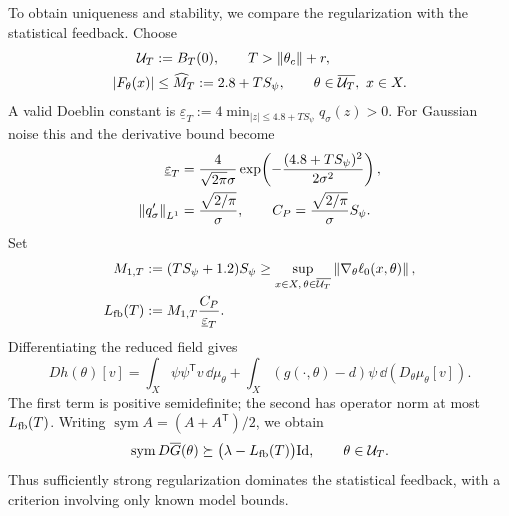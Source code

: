 To obtain uniqueness and stability, we compare the regularization with
the statistical feedback. Choose
\begin{align}
  \mathcal U_T&:=B_T(0),\qquad T>\left\lVert \theta_c\right\rVert+r,
  \label{eq:duffing-UT}\\
  |F_\theta(x)|&\le\widehat M_T:=2.8+TS_\psi,
    \qquad \theta\in\overline{\mathcal U_T},\ x\in X.
  \label{eq:duffing-MT-explicit}
\end{align}
A valid Doeblin constant is
$\underline\varepsilon_T:=4\min_{|z|\le4.8+TS_\psi}q_\sigma(z)>0$.
For Gaussian noise this and the derivative bound become
\begin{align}
  \underline\varepsilon_T
    &=\frac{4}{\sqrt{2\pi}\sigma}
      \exp\!\left(-\frac{(4.8+TS_\psi)^2}{2\sigma^2}\right),
  \label{eq:duffing-epsilonT-explicit}\\
  \left\lVert q_\sigma'\right\rVert_{L^1}&=\frac{\sqrt{2/\pi}}{\sigma},
  \qquad C_P=\frac{\sqrt{2/\pi}}{\sigma}S_\psi.
  \label{eq:duffing-gaussian-CP}
\end{align}
Set
\begin{align}
  M_{1,T}&:=(TS_\psi+1.2)S_\psi
    \ge\sup_{x\in X,\,\theta\in\overline{\mathcal U_T}}
      \left\lVert \nabla_\theta\ell_0(x,\theta)\right\rVert,
  \label{eq:duffing-M1T-explicit}\\
  L_{\rm fb}(T)&:=M_{1,T}\frac{C_P}{\underline\varepsilon_T}.
  \label{eq:duffing-Lfb}
\end{align}
Differentiating the reduced field gives
\begin{equation}
  Dh(\theta)[v]
  =\int_X\psi\psi^{\mathsf T}v\,\dd\mu_\theta
   +\int_X(g(\cdot,\theta)-d)\psi\,\dd(D_\theta\mu_\theta[v]).
  \label{eq:duffing-Dh}
\end{equation}
The first term is positive semidefinite; the second has operator norm
at most $L_{\rm fb}(T)$. Writing $\operatorname{sym}A=(A+A^{\mathsf T})/2$,
we obtain
\begin{equation}
  \operatorname{sym}D\overline G(\theta)
  \succeq\bigl(\lambda-L_{\rm fb}(T)\bigr)\mathrm{Id},
  \qquad\theta\in\mathcal U_T.
  \label{eq:duffing-symmetric-lower-bound}
\end{equation}
Thus sufficiently strong regularization dominates the statistical feedback,
with a criterion involving only known model bounds.

